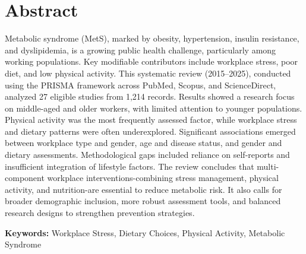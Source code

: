 \chapter*{Abstract}
Metabolic syndrome (MetS), marked by obesity, hypertension, insulin resistance, and dyslipidemia, is a growing public health challenge, particularly among working populations. Key modifiable contributors include workplace stress, poor diet, and low physical activity. This systematic review (2015--2025), conducted using the PRISMA framework across PubMed, Scopus, and ScienceDirect, analyzed 27 eligible studies from 1,214 records. Results showed a research focus on middle-aged and older workers, with limited attention to younger populations. Physical activity was the most frequently assessed factor, while workplace stress and dietary patterns were often underexplored. Significant associations emerged between workplace type and gender, age and disease status, and gender and dietary assessments. Methodological gaps included reliance on self-reports and insufficient integration of lifestyle factors. The review concludes that multi-component workplace interventions-combining stress management, physical activity, and nutrition-are essential to reduce metabolic risk. It also calls for broader demographic inclusion, more robust assessment tools, and balanced research designs to strengthen prevention strategies.

\noindent \textbf{Keywords:} Workplace Stress, Dietary Choices, Physical Activity, Metabolic Syndrome
